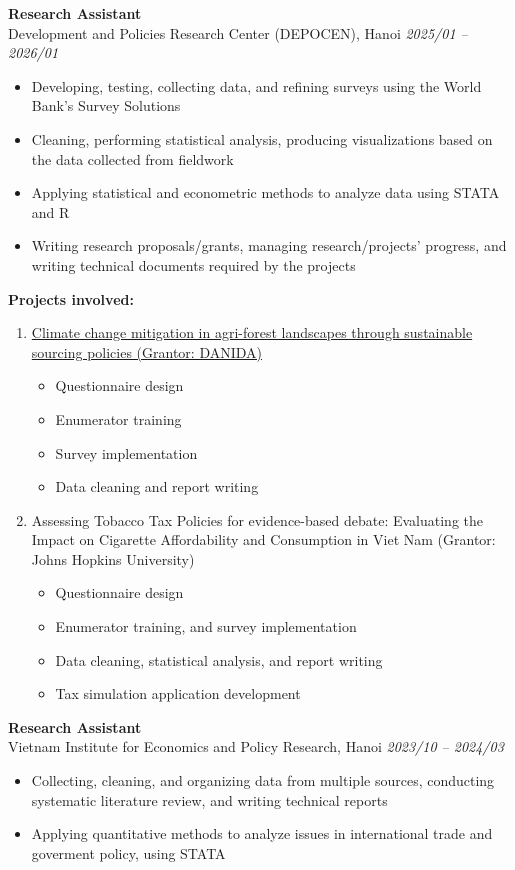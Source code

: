 \documentclass[10.5pt]{article}
\begin{document}
\textbf{Research Assistant} \hfill \\
Development and Policies Research Center (DEPOCEN), Hanoi \hfill \emph{2025/01 -- 2026/01}
\begin{itemize}
\item Developing, testing, collecting data, and refining surveys using the World Bank's Survey Solutions
\item Cleaning, performing statistical analysis, producing visualizations based on the data collected from fieldwork
\item Applying statistical and econometric methods to analyze data using STATA and R
\item Writing research proposals/grants, managing research/projects' progress, and writing technical documents required by the projects
\end{itemize}
\textbf{Projects involved:}
\begin{enumerate}
\item \href{https://www.economics.ku.dk/research/externally-funded-research_new/climate-change-mitigation-in-agroforest-landscapes-through-sustainable-sourcing-policies-cafsus/}{Climate change mitigation in agri-forest landscapes through sustainable sourcing policies (Grantor: DANIDA)}
    \begin{itemize}
        \item Questionnaire design
        \item Enumerator training
        \item Survey implementation
        \item Data cleaning and report writing
    \end{itemize}
    
\item Assessing Tobacco Tax Policies for evidence-based debate: Evaluating the Impact on Cigarette Affordability and Consumption in Viet Nam (Grantor: Johns Hopkins University)
    \begin{itemize}
        \item Questionnaire design
        \item Enumerator training, and survey implementation
        \item Data cleaning, statistical analysis, and report writing
        \item Tax simulation application development
    \end{itemize}
\end{enumerate}

\textbf{Research Assistant} \hfill \\
Vietnam Institute for Economics and Policy Research, Hanoi \hfill \emph{2023/10 -- 2024/03}
\begin{itemize}
\item Collecting, cleaning, and organizing data from multiple sources, conducting systematic literature review, and writing technical reports
\item Applying quantitative methods to analyze issues in international trade and goverment policy, using STATA
\end{itemize}
\end{document}
